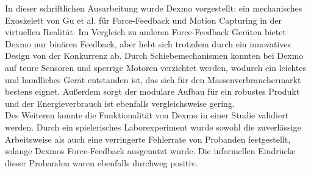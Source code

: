 In dieser schriftlichen Ausarbeitung wurde Dexmo vorgestellt: ein mechanisches Exoskelett von Gu et al. für Force-Feedback und Motion Capturing in der virtuellen Realität. Im Vergleich zu anderen Force-Feedback Geräten bietet Dexmo nur binären Feedback, aber hebt sich trotzdem durch ein innovatives Design von der Konkurrenz ab. Durch Schiebemechanismen konnten bei Dexmo auf teure Sensoren und sperrige Motoren verzichtet werden, wodurch ein leichtes und handliches Gerät entstanden ist, das sich für den Massenverbrauchermarkt bestens eignet. Außerdem sorgt der modulare Aufbau für ein robustes Produkt und der Energieverbrauch ist ebenfalls vergleichsweise gering. \\
Des Weiteren konnte die Funktionalität von Dexmo in einer Studie validiert werden. Durch ein spielerisches Laborexperiment wurde sowohl die zuverlässige Arbeitsweise als auch eine verringerte Fehlerrate von Probanden festgestellt, solange Dexmos Force-Feedback ausgenutzt wurde. Die informellen Eindrücke dieser Probanden waren ebenfalls durchweg positiv.






